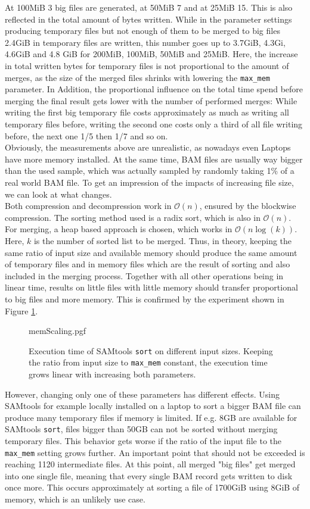 At 100MiB 3 big files are generated, at 50MiB 7 and at 25MiB 15. This is also reflected in the total amount of bytes written. While in the parameter settings producing temporary files but not enough of them to be merged to big files 2.4GiB in temporary files are written, this number goes up to 3.7GiB, 4.3Gi, 4.6GiB and 4.8 GiB for 200MiB, 100MiB, 50MiB and 25MiB. Here, the increase in total written bytes for temporary files is not proportional to the amount of merges, as the size of the merged files shrinks with lowering the \texttt{max\_mem} parameter. In Addition, the proportional influence on the total time spend before merging the final result gets lower with the number of performed merges: While writing the first big temporary file costs approximately as much as writing all temporary files before, writing the second one costs only a third of all file writing before, the next one 1/5 then 1/7 and so on.\\
Obviously, the measurements above are unrealistic, as nowadays even Laptops have more memory installed. At the same time, BAM files are usually way bigger than the used sample, which was actually sampled by randomly taking 1\% of a real world BAM file. To get an impression of the impacts of increasing file size, we can look at what changes. \\
Both compression and decompression work in $\mathcal{O}(n)$, ensured by the blockwise compression. The sorting method used is a radix sort, which is also in $\mathcal{O}(n)$. For merging, a heap based approach is chosen, which works in $\mathcal{O}(n \log(k))$. Here, $k$ is the number of sorted list to be merged. Thus, in theory, keeping the same ratio of input size and available memory should produce the same amount of temporary files and in memory files which are the result of sorting and also included in the merging process. Together with all other operations being in linear time, results on little files with little memory should transfer proportional to big files and more memory. This is confirmed by the experiment shown in Figure \ref{fig:memScaling}.\\
\begin{figure}
        {memScaling.pgf}
    \caption{Execution time of SAMtools \texttt{sort} on different input sizes. Keeping the ratio from input size to \texttt{max\_mem} constant, the execution time grows linear with increasing both parameters.}
    \label{fig:memScaling}
\end{figure}
However, changing only one of these parameters has different effects. Using SAMtools for example locally installed on a laptop to sort a bigger BAM file can produce many temporary files if memory is limited. If e.g. 8GB are available for SAMtools \texttt{sort}, files bigger than 50GB can not be sorted without merging temporary files. This behavior gets worse if the ratio of the input file to the \texttt{max\_mem} setting grows further. An important point that should not be exceeded is reaching 1120 intermediate files. At this point, all merged "big files" get merged into one single file, meaning that every single BAM record gets written to disk once more. This occurs approximately at sorting a file of 1700GiB using 8GiB of memory, which is an unlikely use case. \\
